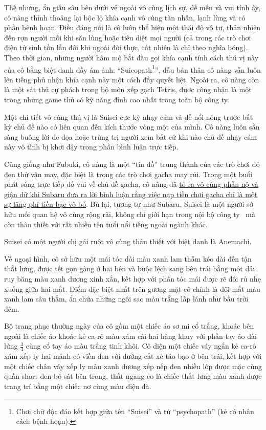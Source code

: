 \documentclass[../main.tex]{subfiles}
\begin{document}
Thế nhưng, ẩn giấu sâu bên dưới vẻ ngoài vô cùng lịch sự, dễ mến và vui tính ấy, cô nàng thỉnh thoảng lại bộc lộ khía cạnh vô cùng tàn nhẫn, lạnh lùng và có phần bệnh hoạn. Điều đáng nói là cô luôn thể hiện một thái độ vô tư, thản nhiên đến rợn người mỗi khi săn lùng hoặc tiêu diệt mọi người (cả trong các trò chơi điện tử sinh tồn lẫn đôi khi ngoài đời thực, tất nhiên là chỉ theo nghĩa bóng). Theo thời gian, những người hâm mộ bắt đầu gọi khía cạnh tính cách thú vị này của cô bằng biệt danh đầy ám ảnh: ``Suicopath\footnote{Chơi chữ độc đáo kết hợp giữa tên ``Suisei'' và từ ``psychopath'' (kẻ có nhân cách bệnh hoạn).}'', dẫu bản thân cô nàng vẫn luôn lên tiếng phủ nhận khía cạnh này một cách đầy quyết liệt. Ngoài ra, cô nàng còn là một sát thủ cự phách trong bộ môn xếp gạch Tetris, được công nhận là một trong những game thủ có kỹ năng đỉnh cao nhất trong toàn bộ công ty.

Một chi tiết vô cùng thú vị là Suisei cực kỳ nhạy cảm và dễ nổi nóng trước bất kỳ chủ đề nào có liên quan đến kích thước vòng một của mình. Cô nàng luôn sẵn sàng buông lời đe dọa hoặc trừng trị người xem bất cứ khi nào chủ đề nhạy cảm này vô tình bị khơi dậy trong phần bình luận trực tiếp.

Cũng giống như Fubuki, cô nàng là một ``tín đồ'' trung thành của các trò chơi đỏ đen thử vận may, đặc biệt là trong các trò chơi gacha may rủi. Trong một buổi phát sóng trực tiếp đố vui về chủ đề gacha, cô nàng đã \href{https://www.youtube.com/watch?v=2w2Srw4YBXc}{tỏ ra vô cùng phẫn nộ và giận dữ khi Subaru đưa ra lời bình luận rằng việc nạp tiền chơi gacha chỉ là một sự lãng phí tiền bạc vô bổ}. Bù lại, tương tự như Subaru, Suisei là một người sở hữu mối quan hệ vô cùng rộng rãi, không chỉ giới hạn trong nội bộ công ty \hll\ mà còn thân thiết với rất nhiều tên tuổi nổi tiếng ngoài ngành khác.

Suisei có một người chị gái ruột vô cùng thân thiết với biệt danh là Anemachi.

Về ngoại hình, cô sở hữu một mái tóc dài màu xanh lam thẫm kéo dài đến tận thắt lưng, được tết gọn gàng ở hai bên và buộc lệch sang bên trái bằng một dải ruy băng màu xanh dương xinh xắn, kết hợp với phần tóc mái được rẽ đôi rủ nhẹ xuống giữa hai mắt. Điểm đặc biệt nhất trên gương mặt cô chính là đôi mắt màu xanh lam sâu thẳm, ẩn chứa những ngôi sao màu trắng lấp lánh như bầu trời đêm.

Bộ trang phục thường ngày của cô gồm một chiếc áo sơ mi cổ trắng, khoác bên ngoài là chiếc áo khoác kẻ ca-rô màu xám cài hai hàng khuy với phần tay áo dài lửng \(\frac{3}{4}\) cùng cổ tay áo màu trắng tinh khôi. Cô diện một chiếc váy ngắn kẻ ca-rô xám xếp ly hai mảnh có viền đen với đường cắt xẻ táo bạo ở bên trái, kết hợp với một chiếc chân váy xếp ly màu xanh dương xếp nếp đen nhiều lớp được mặc cùng quần short đen bó sát bên trong, thắt ngang eo là chiếc thắt lưng màu xanh được trang trí bằng một chiếc nơ cùng màu điệu đà.
\end{document}
